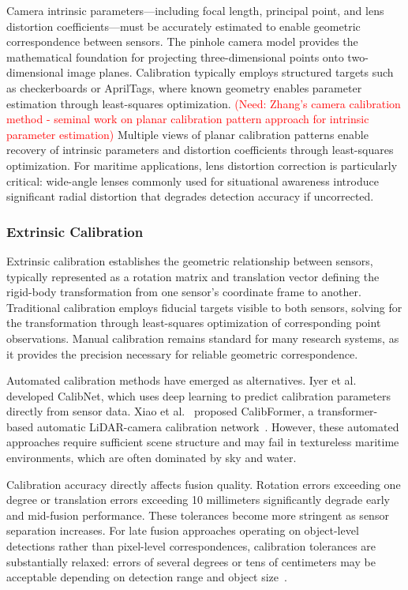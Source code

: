 \documentclass[../main.tex]{subfiles}
\begin{document}
Camera intrinsic parameters---including focal length, principal point, and lens distortion coefficients---must be accurately estimated to enable geometric correspondence between sensors.
The pinhole camera model provides the mathematical foundation for projecting three-dimensional points onto two-dimensional image planes.
Calibration typically employs structured targets such as checkerboards or AprilTags, where known geometry enables parameter estimation through least-squares optimization.
\textcolor{red}{(Need: Zhang's camera calibration method - seminal work on planar calibration pattern approach for intrinsic parameter estimation)}
Multiple views of planar calibration patterns enable recovery of intrinsic parameters and distortion coefficients through least-squares optimization.
For maritime applications, lens distortion correction is particularly critical: wide-angle lenses commonly used for situational awareness introduce significant radial distortion that degrades detection accuracy if uncorrected.

\subsubsection{Extrinsic Calibration}

Extrinsic calibration establishes the geometric relationship between sensors, typically represented as a rotation matrix and translation vector defining the rigid-body transformation from one sensor's coordinate frame to another.
Traditional calibration employs fiducial targets visible to both sensors, solving for the transformation through least-squares optimization of corresponding point observations.
Manual calibration remains standard for many research systems, as it provides the precision necessary for reliable geometric correspondence.

Automated calibration methods have emerged as alternatives. Iyer et al.~\cite{iyer2018} developed CalibNet, which uses deep learning to predict calibration parameters directly from sensor data.
Xiao et al.~\cite{xiao2024} proposed CalibFormer, a transformer-based automatic LiDAR-camera calibration network~\cite{schneider2017, wu2021}.
However, these automated approaches require sufficient scene structure and may fail in textureless maritime environments, which are often dominated by sky and water.

Calibration accuracy directly affects fusion quality.
Rotation errors exceeding one degree or translation errors exceeding 10 millimeters significantly degrade early and mid-fusion performance.
These tolerances become more stringent as sensor separation increases.
For late fusion approaches operating on object-level detections rather than pixel-level correspondences, calibration tolerances are substantially relaxed: errors of several degrees or tens of centimeters may be acceptable depending on detection range and object size~\cite{huang2024}.
\end{document}
